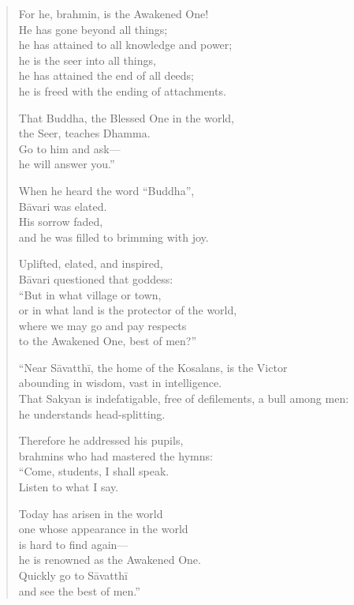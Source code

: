 \documentclass[12pt,openany]{book}%
\begin{document}
\begin{verse}
For he, brahmin, is the Awakened One! \\
He has gone beyond all things; \\
he has attained to all knowledge and power; \\
he is the seer into all things, \\
he has attained the end of all deeds; \\
he is freed with the ending of attachments. 

That Buddha, the Blessed One in the world, \\
the Seer, teaches Dhamma. \\
Go to him and ask—\\
he will answer you.” 

When he heard the word “Buddha”, \\
\textsanskrit{Bāvari} was elated. \\
His sorrow faded, \\
and he was filled to brimming with joy. 

Uplifted, elated, and inspired, \\
\textsanskrit{Bāvari} questioned that goddess: \\
“But in what village or town, \\
or in what land is the protector of the world, \\
where we may go and pay respects \\
to the Awakened One, best of men?” 

“Near \textsanskrit{Sāvatthī}, the home of the Kosalans, is the Victor \\
abounding in wisdom, vast in intelligence. \\
That Sakyan is indefatigable, free of defilements, a bull among men: \\
he understands head-splitting. 

Therefore he addressed his pupils, \\
brahmins who had mastered the hymns: \\
“Come, students, I shall speak. \\
Listen to what I say. 

Today has arisen in the world \\
one whose appearance in the world \\
is hard to find again—\\
he is renowned as the Awakened One. \\
Quickly go to \textsanskrit{Sāvatthī} \\
and see the best of men.” 


\end{verse}
\end{document}
